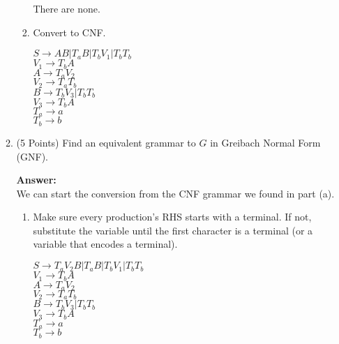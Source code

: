 \documentclass[12pt]{article}
\begin{document}
\begin{spacing}{1.5}
\begin{enumerate}
\begin{enumerate}
\begin{enumerate}
                                          There are none.

                                    \item[Step 4 and 5:] Convert to CNF.

                                          $S \rightarrow AB | T_aB | T_bV_1 | T_bT_b$ \\
                                          $V_1 \rightarrow T_bA$ \\
                                          $A \rightarrow T_aV_2$ \\
                                          $V_2 \rightarrow T_aT_b$ \\
                                          $B \rightarrow T_bV_3 | T_bT_b$ \\
                                          $V_3 \rightarrow T_bA$ \\
                                          $T_a \rightarrow a$ \\
                                          $T_b \rightarrow b$
                              \end{enumerate}

                              \newpage
                        \item[(b)] (5 Points) Find an equivalent grammar to $G$ in Greibach Normal Form (GNF).

                              \textbf{Answer:} \\
                              We can start the conversion from the CNF grammar we found in part (a).

                              \begin{enumerate}
                                    \item[Step 1:] Make sure every production's RHS starts with a terminal. If not, substitute the variable until the first character is a terminal (or a variable that encodes a terminal).

                                          $S \rightarrow T_aV_2B | T_aB | T_bV_1 | T_bT_b$ \\
                                          $V_1 \rightarrow T_bA$ \\
                                          $A \rightarrow T_aV_2$ \\
                                          $V_2 \rightarrow T_aT_b$ \\
                                          $B \rightarrow T_bV_3 | T_bT_b$ \\
                                          $V_3 \rightarrow T_bA$ \\
                                          $T_a \rightarrow a$ \\
                                          $T_b \rightarrow b$


\end{enumerate}
\end{enumerate}
\end{enumerate}
\end{spacing}
\end{document}
